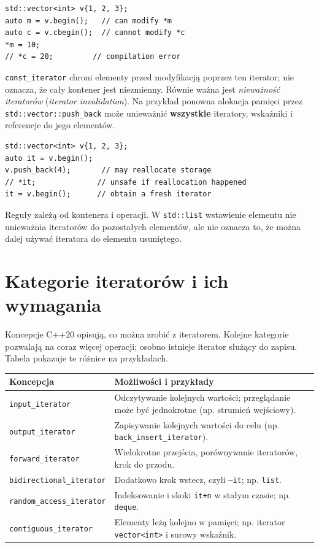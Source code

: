 \begin{lstlisting}
std::vector<int> v{1, 2, 3};
auto m = v.begin();   // can modify *m
auto c = v.cbegin();  // cannot modify *c
*m = 10;
// *c = 20;         // compilation error
\end{lstlisting}

\texttt{const\_iterator} chroni elementy przed modyfikacją poprzez
ten iterator; nie oznacza, że cały kontener jest niezmienny. Równie
ważna jest \emph{nieważność iteratorów} (\textit{iterator invalidation}).
Na przykład ponowna alokacja pamięci przez \texttt{std::vector::push\_back}
może unieważnić \textbf{wszystkie} iteratory, wskaźniki i referencje do
jego elementów.

\begin{lstlisting}
std::vector<int> v{1, 2, 3};
auto it = v.begin();
v.push_back(4);       // may reallocate storage
// *it;              // unsafe if reallocation happened
it = v.begin();      // obtain a fresh iterator
\end{lstlisting}

Reguły zależą od kontenera i operacji. W \texttt{std::list} wstawienie
elementu nie unieważnia iteratorów do pozostałych elementów, ale nie
oznacza to, że można dalej używać iteratora do elementu usuniętego.

\section{Kategorie iteratorów i ich wymagania}
\label{sec:cpp8-iterator-categories}

Koncepcje C++20 opisują, co można zrobić z iteratorem. Kolejne
kategorie pozwalają na coraz więcej operacji; osobno istnieje iterator
służący do zapisu. Tabela pokazuje te różnice na przykładach.

\begin{center}
\small
\begin{tabular}{|p{5.2cm}|p{7.3cm}|}
\hline
\textbf{Koncepcja} & \textbf{Możliwości i przykłady} \\
\hline
\texttt{input\_iterator} & Odczytywanie kolejnych wartości; przeglądanie może być jednokrotne (np. strumień wejściowy). \\
\hline
\texttt{output\_iterator} & Zapisywanie kolejnych wartości do celu (np. \texttt{back\_insert\_iterator}). \\
\hline
\texttt{forward\_iterator} & Wielokrotne przejścia, porównywanie iteratorów, krok do przodu. \\
\hline
\texttt{bidirectional\_iterator} & Dodatkowo krok wstecz, czyli \texttt{--it}; np. \texttt{list}. \\
\hline
\texttt{random\_access\_iterator} & Indeksowanie i skoki \texttt{it+n} w stałym czasie; np. \texttt{deque}. \\
\hline
\texttt{contiguous\_iterator} & Elementy leżą kolejno w pamięci; np. iterator \texttt{vector<int>} i surowy wskaźnik. \\
\hline
\end{tabular}
\end{center}

